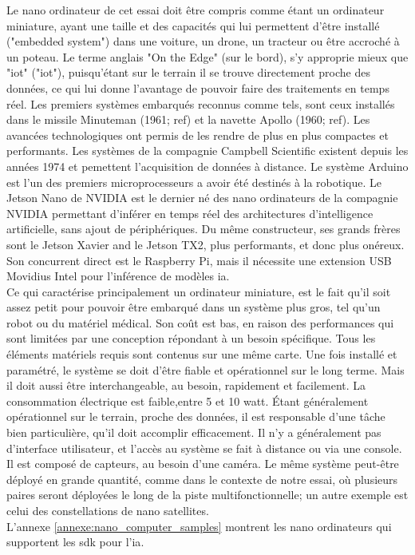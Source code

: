 ﻿\noindent Le nano ordinateur de cet essai doit être compris comme étant un ordinateur miniature, ayant une taille et des capacités qui lui permettent d'être installé ("embedded system") dans une voiture, un drone, un tracteur ou être accroché à un poteau. Le terme anglais "On the Edge" (sur le bord), s'y approprie mieux que "\acrshort{iot}" ("\acrlong{iot}"), puisqu'étant sur le terrain il se trouve directement proche des données, ce qui lui donne l'avantage de pouvoir faire des traitements en temps réel. Les premiers systèmes embarqués reconnus comme tels, sont ceux installés dans le missile Minuteman (1961; ref) et la navette Apollo (1960; ref). Les avancées technologiques ont permis de les rendre de plus en plus compactes et performants. Les systèmes de la compagnie Campbell Scientific existent depuis les années 1974 et pemettent l'acquisition de données à distance. Le système Arduino est l'un des premiers microprocesseurs a avoir été destinés à la robotique. Le Jetson Nano de NVIDIA est le dernier né des nano ordinateurs de la compagnie NVIDIA permettant d'inférer en temps réel des architectures d'intelligence artificielle, sans ajout de périphériques. Du même constructeur, ses grands frères sont le Jetson Xavier and le Jetson TX2, plus performants, et donc plus onéreux. Son concurrent direct est le Raspberry Pi, mais il nécessite une extension USB Movidius Intel pour l'inférence de modèles \acrshort{ia}. 
\vspace{\baselineskip}
\\
\noindent Ce qui caractérise principalement un ordinateur miniature, est le fait qu'il soit assez petit pour pouvoir être embarqué dans un système plus gros, tel qu'un robot ou du matériel médical. Son coût est bas, en raison des performances qui sont limitées par une conception répondant à un besoin spécifique. Tous les éléments matériels requis sont contenus sur une même carte. Une fois installé et paramétré, le système se doit d'être fiable et opérationnel sur le long terme. Mais il doit aussi être interchangeable, au besoin, rapidement et facilement. La consommation électrique est faible,entre 5 et 10 watt. Étant généralement opérationnel sur le terrain, proche des données, il est responsable d'une tâche bien particulière, qu'il doit accomplir efficacement. Il n'y a généralement pas d'interface utilisateur, et l'accès au système se fait à distance ou via une console. Il est composé de capteurs, au besoin d'une caméra. Le même système peut-être déployé en grande quantité, comme dans le contexte de notre essai, où plusieurs paires seront déployées le long de la piste multifonctionnelle; un autre exemple est celui des constellations de nano satellites.
\vspace{\baselineskip}
\\
\noindent L'annexe \ref{annexe:nano_computer_samples} montrent les nano ordinateurs qui supportent les \acrshort{sdk} pour l'\acrshort{ia}.
